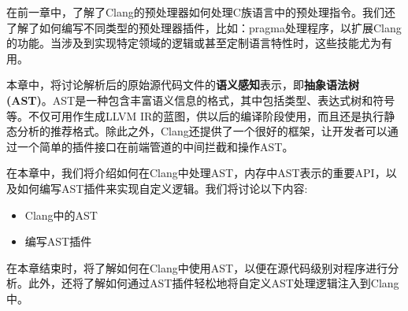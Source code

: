 在前一章中，了解了Clang的预处理器如何处理C族语言中的预处理指令。我们还了解了如何编写不同类型的预处理器插件，比如：pragma处理程序，以扩展Clang的功能。当涉及到实现特定领域的逻辑或甚至定制语言特性时，这些技能尤为有用。

本章中，将讨论解析后的原始源代码文件的\textbf{语义感知}表示，即\textbf{抽象语法树(AST)}。AST是一种包含丰富语义信息的格式，其中包括类型、表达式树和符号等。不仅可用作生成LLVM IR的蓝图，供以后的编译阶段使用，而且还是执行静态分析的推荐格式。除此之外，Clang还提供了一个很好的框架，让开发者可以通过一个简单的插件接口在前端管道的中间拦截和操作AST。

在本章中，我们将介绍如何在Clang中处理AST，内存中AST表示的重要API，以及如何编写AST插件来实现自定义逻辑。我们将讨论以下内容:

\begin{itemize}
\item Clang中的AST
\item 编写AST插件
\end{itemize}

在本章结束时，将了解如何在Clang中使用AST，以便在源代码级别对程序进行分析。此外，还将了解如何通过AST插件轻松地将自定义AST处理逻辑注入到Clang中。






































